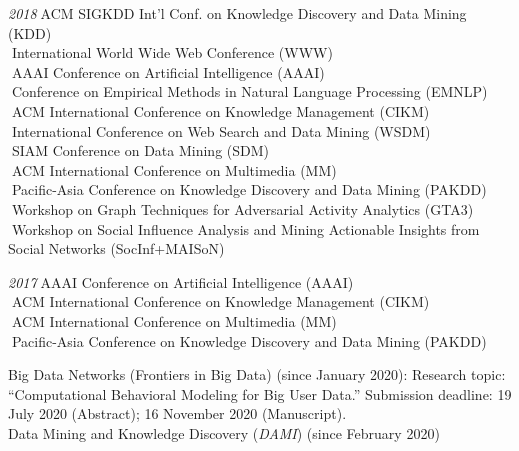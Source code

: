 \documentclass[10pt]{article}
\newenvironment{myindentpar}[1]%
{\begin{list}{}%
         {\setlength{\leftmargin}{#1}}%
         \item[]%
}
{\end{list}}
\newcounter{list}
\begin{document}
\begin{myindentpar}{0.75cm}
{\hspace{-0.75cm}\textit{2018}\textcolor{white}{.}ACM SIGKDD Int'l Conf. on Knowledge Discovery and Data Mining (KDD) \\
\textcolor{white}{.}International World Wide Web Conference (WWW) \\
\textcolor{white}{.}AAAI Conference on Artificial Intelligence (AAAI) \\
\textcolor{white}{.}Conference on Empirical Methods in Natural Language Processing (EMNLP) \\
\textcolor{white}{.}ACM International Conference on Knowledge Management (CIKM) \\
\textcolor{white}{.}International Conference on Web Search and Data Mining (WSDM) \\
\textcolor{white}{.}SIAM Conference on Data Mining (SDM) \\
\textcolor{white}{.}ACM International Conference on Multimedia (MM) \\
\textcolor{white}{.}Pacific-Asia Conference on Knowledge Discovery and Data Mining (PAKDD) \\
\textcolor{white}{.}Workshop on Graph Techniques for Adversarial Activity Analytics (GTA3) \\
\textcolor{white}{.}Workshop on Social Influence Analysis and Mining Actionable Insights from Social Networks (SocInf+MAISoN)

\hspace{-0.75cm}\textit{2017}\textcolor{white}{.}AAAI Conference on Artificial Intelligence (AAAI) \\
\textcolor{white}{.}ACM International Conference on Knowledge Management (CIKM) \\
\textcolor{white}{.}ACM International Conference on Multimedia (MM) \\
\textcolor{white}{.}Pacific-Asia Conference on Knowledge Discovery and Data Mining (PAKDD)

}

\hspace{-0.75cm}{\bf Associate Editor}

{\small

Big Data Networks (Frontiers in Big Data) (since January 2020): Research topic: ``Computational Behavioral Modeling for Big User Data.'' Submission deadline: 19 July 2020 (Abstract); 16 November 2020 (Manuscript). \\
Data Mining and Knowledge Discovery (\textit{DAMI}) (since February 2020)

}


\end{myindentpar}
\end{document}
